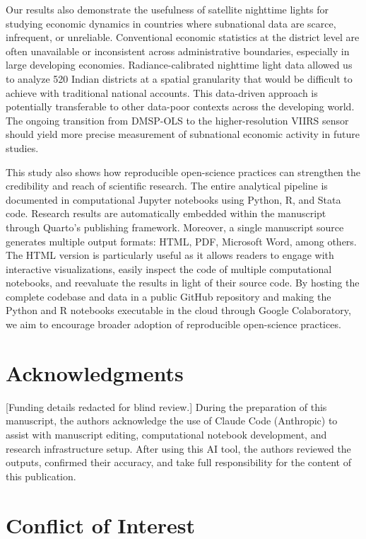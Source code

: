 \documentclass[
  a4paper, 
  twoside,
  review
]{article}
\newcounter{code}
\begin{document}
Our results also demonstrate the usefulness of satellite nighttime
lights for studying economic dynamics in countries where subnational
data are scarce, infrequent, or unreliable. Conventional economic
statistics at the district level are often unavailable or inconsistent
across administrative boundaries, especially in large developing
economies. Radiance-calibrated nighttime light data allowed us to
analyze 520 Indian districts at a spatial granularity that would be
difficult to achieve with traditional national accounts. This
data-driven approach is potentially transferable to other data-poor
contexts across the developing world. The ongoing transition from
DMSP-OLS to the higher-resolution VIIRS sensor should yield more precise
measurement of subnational economic activity in future studies.

This study also shows how reproducible open-science practices can
strengthen the credibility and reach of scientific research. The entire
analytical pipeline is documented in computational Jupyter notebooks
using Python, R, and Stata code. Research results are automatically
embedded within the manuscript through Quarto's publishing framework.
Moreover, a single manuscript source generates multiple output formats:
HTML, PDF, Microsoft Word, among others. The HTML version is
particularly useful as it allows readers to engage with interactive
visualizations, easily inspect the code of multiple computational
notebooks, and reevaluate the results in light of their source code. By
hosting the complete codebase and data in a public GitHub repository and
making the Python and R notebooks executable in the cloud through Google
Colaboratory, we aim to encourage broader adoption of reproducible
open-science practices.

\section{Acknowledgments}\label{acknowledgments}

{[}Funding details redacted for blind review.{]} During the preparation
of this manuscript, the authors acknowledge the use of Claude Code
(Anthropic) to assist with manuscript editing, computational notebook
development, and research infrastructure setup. After using this AI
tool, the authors reviewed the outputs, confirmed their accuracy, and
take full responsibility for the content of this publication.

\section{Conflict of Interest}\label{conflict-of-interest}
\end{document}
